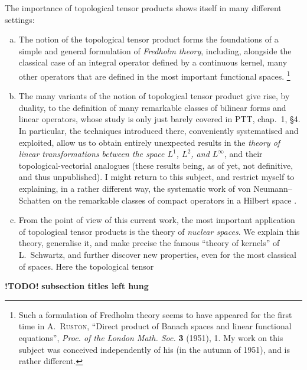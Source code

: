 \documentclass{article}
\theoremstyle{plain}
\theoremstyle{definition}
\newcommand{\todo}{\textbf{ !TODO! }}
\newcommand{\oldpage}[1]{\marginpar{\footnotesize$\Big\vert$ \textit{p.~#1}}}
\begin{document}
The importance of topological tensor products shows itself in many different settings:
\begin{enumerate}[a)]
  \item The notion of the topological tensor product forms the foundations of a simple and general formulation of \emph{Fredholm theory}, including, alongside the classical case of an integral operator defined by a continuous kernel, many other operators that are defined in the most important functional spaces.%
    \footnote{Such a formulation of Fredholm theory seems to have appeared for the first time in \textsc{A.~Ruston}, ``Direct product of Banach spaces and linear functional equations'', \emph{Proc. of the London Math. Soc.} \textbf{3} (1951), 1. My work on this subject was conceived independently of his (in the autumn of 1951), and is rather different.}
  \item The many variants of the notion of topological tensor product give rise, by duality, to the definition of many remarkable classes of bilinear forms and linear operators, whose
\oldpage{74}
    study is only just barely covered in PTT, chap.~1, §4.
    In particular, the techniques introduced there, conveniently systematised and exploited, allow us to obtain entirely unexpected results in the \emph{theory of linear transformations between the space $L^1$, $L^2$, and $L^\infty$}, and their topological-vectorial analogues (these results being, as of yet, not definitive, and thus unpublished).
    I might return to this subject, and restrict myself to explaining, in a rather different way, the systematic work of von Neumann--Schatten on the remarkable classes of compact operators in a Hilbert space \cite[chap.~4]{8}.
  \item From the point of view of this current work, the most important application of topological tensor products is the theory of \emph{nuclear spaces}.
    We explain this theory, generalise it, and make precise the famous ``theory of kernels'' of L.~Schwartz, and further discover new properties, even for the most classical of spaces.
    Here the topological tensor
\end{enumerate}


\todo\textbf{subsection titles left hung}



\nocite{*}

\begin{thebibliography}{10}
\end{thebibliography}
\end{document}
